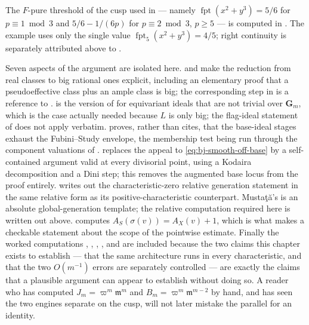 The $F$-pure threshold of the cusp used in  --- namely
$\operatorname{fpt}(x^2+y^3)=5/6$ for $p\equiv1\bmod3$ and
$5/6-1/(6p)$ for $p\equiv2\bmod3$, $p\ge5$ --- is computed in
\cite[Example~4.3]{MTW05}.  The example uses only the single value
$\operatorname{fpt}_5(x^2+y^3)=4/5$; right continuity is separately
attributed above to \cite[Theorem~6.6]{ST12}.

Seven aspects of the argument are isolated here.   and
 make the reduction from real classes
to big rational ones explicit, including an elementary proof that a
pseudoeffective class plus an ample class is big; the corresponding step in
\cite{BJ22b} is a reference to \cite[Lemma~5.9]{BJ22}.
 is the version of
 for equivariant ideals that are not trivial
over $\mathbf G_m$, which is the case actually needed because $L$ is
only big; the flag-ideal statement of 
does not apply verbatim.   proves, rather than
cites, that the base-ideal stages exhaust the Fubini--Study envelope, the
membership test being run through the component valuations of
.   replaces
the appeal to \eqref{eq:bj-smooth-off-base} by a self-contained argument
valid at every divisorial point, using a Kodaira decomposition and a Dini
step; this removes the augmented base locus from the proof entirely.
 writes out the
characteristic-zero relative generation statement in the same relative form
as its positive-characteristic counterpart.  Musta\c t\u a's
\cite[Theorem~4.1]{MustataTest} is an absolute global-generation template;
the relative computation required here is written out above.
 computes
$A_S(\sigma(v))=A_X(v)+1$, which is what makes
 a checkable statement about the
scope of the pointwise estimate.  Finally the worked computations
, ,
, ,
 and  are
included because the two claims this chapter exists to establish --- that
the same architecture runs in every characteristic, and that the two
$O(m^{-1})$ errors are separately controlled --- are exactly the claims
that a plausible argument can appear to establish without doing so.  A
reader who has computed $J_m=\varpi^m\mathfrak m^m$ and
$B_m=\varpi^m\mathfrak m^{m-2}$ by hand, and has seen the two engines
separate on the cusp, will not later mistake the parallel for an identity.
